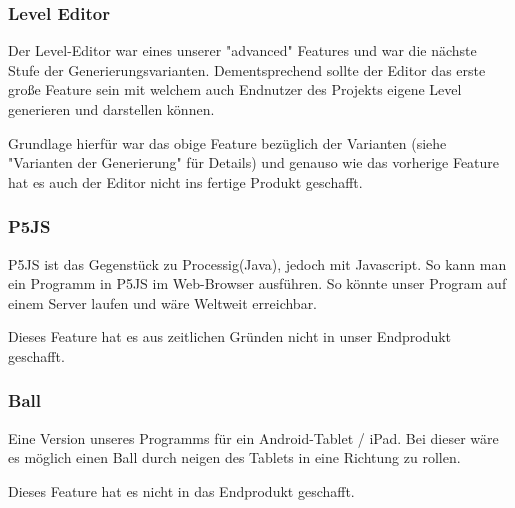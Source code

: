     \subsubsection*{Level Editor}
        Der Level-Editor war eines unserer "advanced" Features und war die nächste Stufe der Generierungsvarianten. Dementsprechend sollte der Editor das erste große Feature sein mit welchem auch Endnutzer des Projekts eigene Level generieren und darstellen können. 
        
        Grundlage hierfür war das obige Feature bezüglich der Varianten (siehe "Varianten der Generierung" für Details) und genauso wie das vorherige Feature hat es auch der Editor nicht ins fertige Produkt geschafft. 


    \subsubsection*{P5JS}
		P5JS ist das Gegenstück zu Processig(Java), jedoch mit Javascript. So kann man ein Programm in P5JS im Web-Browser ausführen. So könnte unser Program auf einem Server laufen  und wäre Weltweit erreichbar. 
		
		Dieses Feature hat es aus zeitlichen Gründen nicht in unser Endprodukt geschafft.
		 

    \subsubsection*{Ball}
    	Eine Version unseres Programms für ein Android-Tablet / iPad. Bei dieser wäre es möglich einen Ball durch neigen des Tablets in eine Richtung zu rollen.
    	
    	Dieses Feature hat es nicht in das Endprodukt geschafft. 

		
 
		
  
